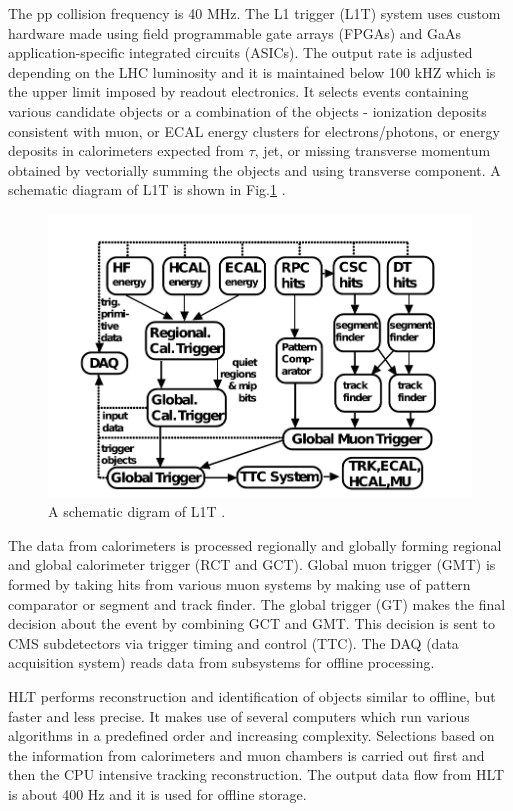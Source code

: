 The pp collision frequency is 40 MHz. The L1 trigger (L1T) system uses custom hardware made using field programmable gate arrays (FPGAs) and GaAs application-specific integrated circuits (ASICs). The output rate is adjusted depending on the LHC luminosity and it is maintained below 100 kHZ which is the upper limit imposed by readout electronics. It selects events containing various candidate objects or a combination of the objects - ionization deposits consistent with muon, or ECAL energy clusters for electrons/photons, or energy deposits in calorimeters expected from $\tau$, jet, or missing transverse momentum obtained by vectorially summing the objects and using transverse component. A schematic diagram of L1T is shown in Fig.\ref{fig:L1Tsystem} \cite{Khachatryan:2016bia}.
\begin{figure}[h!]
\centering
\includegraphics[width=0.7\linewidth]{../Figures/Chap2/L1Tsystem}
\caption[Schematic of L1T]{A schematic digram of L1T \cite{Khachatryan:2016bia}.}
\label{fig:L1Tsystem}
\end{figure}
The data from calorimeters is processed regionally and globally forming regional and global calorimeter trigger (RCT and GCT). Global muon trigger (GMT) is formed by taking hits from various muon systems by making use of pattern comparator or segment and track finder. The global trigger (GT) makes the final decision about the event by combining GCT and GMT. This decision is sent to CMS subdetectors via trigger timing and control (TTC). The DAQ (data acquisition system) reads data from subsystems for offline processing.

HLT performs reconstruction and identification of objects similar to offline, but faster and less precise. It makes use of several computers which run various algorithms in a predefined order and increasing complexity. Selections based on the information from calorimeters and muon chambers is carried out first and then the CPU intensive tracking reconstruction. The output data flow from HLT is about 400 Hz and it is used for offline storage. 

